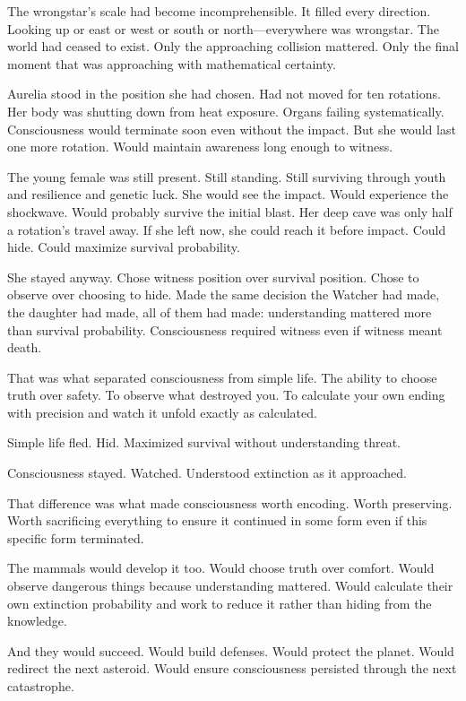 The wrongstar's scale had become incomprehensible. It filled every direction. Looking up or east or west or south or north—everywhere was wrongstar. The world had ceased to exist. Only the approaching collision mattered. Only the final moment that was approaching with mathematical certainty.

Aurelia stood in the position she had chosen. Had not moved for ten rotations. Her body was shutting down from heat exposure. Organs failing systematically. Consciousness would terminate soon even without the impact. But she would last one more rotation. Would maintain awareness long enough to witness.

The young female was still present. Still standing. Still surviving through youth and resilience and genetic luck. She would see the impact. Would experience the shockwave. Would probably survive the initial blast. Her deep cave was only half a rotation's travel away. If she left now, she could reach it before impact. Could hide. Could maximize survival probability.

She stayed anyway. Chose witness position over survival position. Chose to observe over choosing to hide. Made the same decision the Watcher had made, the daughter had made, all of them had made: understanding mattered more than survival probability. Consciousness required witness even if witness meant death.

That was what separated consciousness from simple life. The ability to choose truth over safety. To observe what destroyed you. To calculate your own ending with precision and watch it unfold exactly as calculated.

Simple life fled. Hid. Maximized survival without understanding threat.

Consciousness stayed. Watched. Understood extinction as it approached.

That difference was what made consciousness worth encoding. Worth preserving. Worth sacrificing everything to ensure it continued in some form even if this specific form terminated.

The mammals would develop it too. Would choose truth over comfort. Would observe dangerous things because understanding mattered. Would calculate their own extinction probability and work to reduce it rather than hiding from the knowledge.

And they would succeed. Would build defenses. Would protect the planet. Would redirect the next asteroid. Would ensure consciousness persisted through the next catastrophe.

